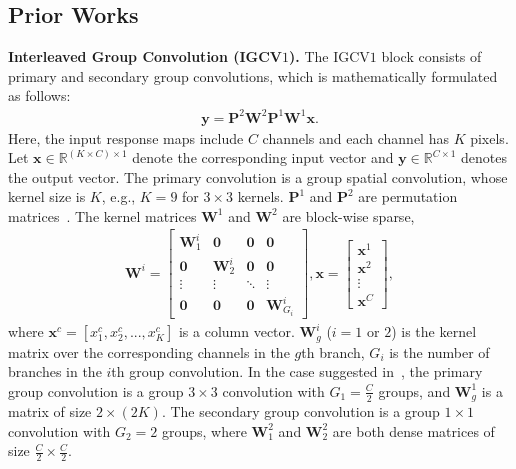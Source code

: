 \documentclass{bmvc2k}
\begin{document}
	\subsection{Prior Works}
	\textbf{Interleaved Group Convolution (IGCV$1$).}
	The IGCV$1$ block
	consists of primary and secondary group convolutions,
	which is mathematically formulated as follows:
	\begin{align}
	\mathbf{y} = \mathbf{P}^2\mathbf{W}^2 \mathbf{P}^1\mathbf{W}^1 \mathbf{x}.
	\label{eqn:IGC}
	\end{align}
	Here, the input response maps include $C$ channels and each channel has $K$ pixels. Let $\mathbf{x} \in \mathbb{R}^{(K\times C)\times 1}$ denote the corresponding input vector and $\mathbf{y} \in \mathbb{R}^{C\times1}$ denotes the output vector. The primary convolution is a group spatial convolution, whose kernel size is $K$, e.g., $K=9$ for $3\times 3$ kernels. $\mathbf{P}^1$ and $\mathbf{P}^2$ are permutation matrices~\cite{zhang2017interleaved}.
	The kernel matrices $\mathbf{W}^1$ and $\mathbf{W}^2$ are block-wise sparse,
	\begin{align}
	\mathbf{W}^i =  \begin{bmatrix}
	\mathbf{W}_{1}^i & \boldsymbol{0} &  \boldsymbol{0} &  \boldsymbol{0} \\[0.3em]
	\boldsymbol{0} & \mathbf{W}_{2}^i  & \boldsymbol{0} & \boldsymbol{0} \\[0.3em]
	\vdots & \vdots & \ddots  & \vdots \\[0.3em]
	\boldsymbol{0} & \boldsymbol{0} & \boldsymbol{0} & \mathbf{W}_{G_i}^i
	\end{bmatrix},
	\mathbf{x} =  \begin{bmatrix}
	\mathbf{x}^{1}\\[0.3em]
	\mathbf{x}^{2}  \\[0.3em]
	\vdots \\[0.3em]
	\mathbf{x}^{C}
	\end{bmatrix},
	\label{eqn:groupconvolution}
	\end{align}
	where $\mathbf{x}^{c}=[x_1^c,x_2^c,...,x_{K}^c]$ is a column vector. $\mathbf{W}_{g}^i$ ($i=1$ or $2$) is
	the kernel matrix
	over the corresponding channels
	in the $g$th branch,
	$G_i$ is the number of branches
	in the $i$th group convolution.
	In the case suggested in~\cite{zhang2017interleaved},
	the primary group convolution is a
	group $3\times 3$
	convolution with $G_1 = \frac{C}{2}$ groups,
	and $\mathbf{W}^1_g$ is a matrix of size $2 \times (2K)$.
	The secondary group convolution is a group $1\times 1$ convolution with $G_2 = 2$ groups,
	where $\mathbf{W}^2_1$ and $\mathbf{W}^2_2$
	are both dense matrices of size $\frac{C}{2} \times \frac{C}{2}$.
	
\end{document}
